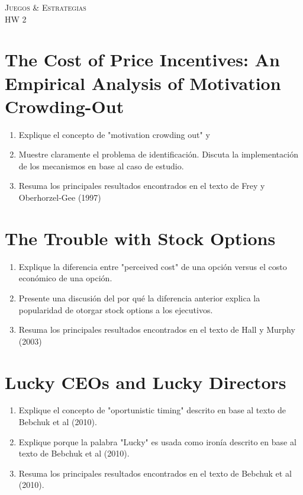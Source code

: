 \documentclass{exam}
\begin{document}
\begin{center}
\LARGE{{\textsc{Juegos \& Estrategias}}}\\
\Large{{\textsc{HW 2}}}
\end{center}

\hline{}{}
 \begin{flushleft}

\end{flushleft}
\hline{}{}

\section{The Cost of Price Incentives: An Empirical Analysis of Motivation Crowding-Out} %

\begin{enumerate}
    \item Explique el concepto de "motivation crowding out" y 
    \item Muestre claramente el problema de identificación. Discuta la implementación de los mecanismos en base al caso de estudio.
    \item Resuma los principales resultados encontrados en el texto de Frey y Oberhorzel-Gee (1997)
\end{enumerate}


\section{The Trouble with Stock Options} %

\begin{enumerate}
    \item Explique la diferencia entre "perceived cost" de una opción versus el costo económico de una opción.
    \item Presente una discusión del por qué la diferencia anterior explica la popularidad de otorgar stock options a los ejecutivos.
    \item Resuma los principales resultados encontrados en el texto de Hall y Murphy (2003)
\end{enumerate}


\section{Lucky CEOs and Lucky Directors} %
  
  \begin{enumerate}
    \item Explique el concepto de "oportunistic timing" descrito en base al texto de Bebchuk et al (2010).
    \item Explique porque la palabra  "Lucky" es usada como ironía descrito en base al texto de Bebchuk et al (2010).
    \item Resuma los principales resultados encontrados en el texto de Bebchuk et al (2010).
\end{enumerate}


  
\end{document}
